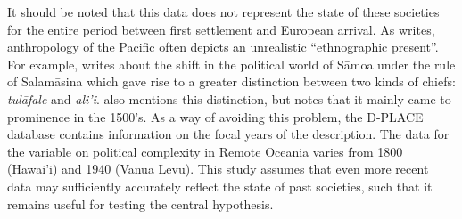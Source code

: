 \documentclass[a4paper,10pt]{article} %
\begin{document}



It should be noted that this data does not represent the state of these societies for the entire period between first settlement and European arrival. As \citet{meleisea1995} writes, anthropology of the Pacific often depicts an unrealistic ``ethnographic present''. For example, \citet[185]{schoeffel87} writes about the shift in the political world of S\={a}moa under the rule of Salam\={a}sina which gave rise to a greater distinction between two kinds of chiefs: \emph{tul\={a}fale} and \emph{ali'i}. \citet[249]{kirch2017road} also mentions this distinction, but notes that it mainly came to prominence in the 1500's. As a way of avoiding this problem, the D-PLACE database \citep{d_place_all} contains information on the focal years of the description. The data for the variable on political complexity in Remote Oceania varies from 1800 (Hawai'i) and 1940 (Vanua Levu). This study assumes that even more recent data may sufficiently accurately reflect the state of past societies, such that it remains useful for testing the central hypothesis.
\end{document}
